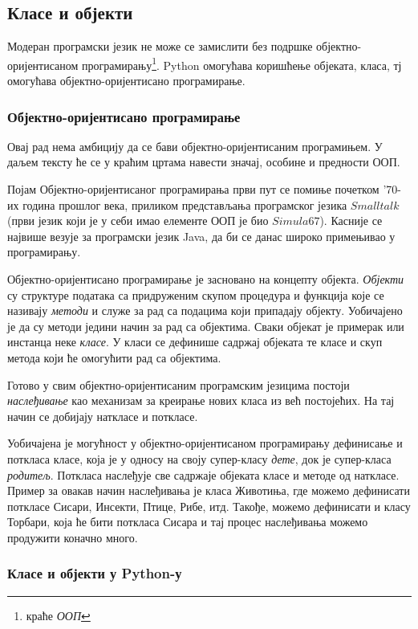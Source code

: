 \subsection{Класе и објекти}

Модеран програмски језик не може се замислити без подршке објектно-оријентисаном програмирању\footnote{краће \emph{ООП}}. Python омогућава коришћење објеката, класа, тј омогућава објектно-оријентисано програмирање.

\subsubsection{Објектно-оријентисано програмирање}

Овај рад нема амбицију да се бави објектно-оријентисаним програмињем. У даљем тексту ће се у краћим цртама навести значај, особине и предности ООП.

Појам Објектно-оријентисаног програмирања први пут се помиње почетком '70-их година прошлог века, приликом представљања програмског језика $Smalltalk$ (први језик који је у себи имао елементе ООП је био $Simula67$). Касније се највише везује за програмски језик Java, да би се данас широко примењивао у програмирању.

Објектно-оријентисано програмирање је засновано на концепту објекта. \emph{Објекти} су структуре података са придруженим скупом процедура и функција које се називају \emph{методи} и служе за рад са подацима који припадају објекту. Уобичајено је да су методи једини начин за рад са објектима. Сваки објекат је примерак или инстанца неке \emph{класе}. У класи се дефинише садржај објеката те класе и скуп метода који ће омогућити рад са објектима.

Готово у свим објектно-оријентисаним програмским језицима постоји \emph{наслеђивање} као механизам за креирање нових класа из већ постојећих. На тај начин се добијају наткласе и поткласе.

Уобичајена је могућност у објектно-оријентисаном програмирању дефинисање и поткласа класе, која је у односу на своју супер-класу \emph{дете}, док је супер-класа \emph{родитељ}. Поткласа наслеђује све садржаје објеката класе и методе од наткласе. Пример за овакав начин наслеђивања је класа Животиња, где можемо дефинисати поткласе Сисари, Инсекти, Птице, Рибе, итд. Такође, можемо дефинисати и класу Торбари, која ће бити поткласа Сисара и тај процес наслеђивања можемо продужити коначно много.

\subsubsection{Класе и објекти у Python-у}

